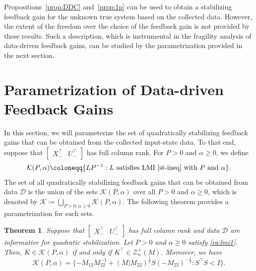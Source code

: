 \documentclass[9pt,shortpaper,twoside,web]{ieeecolor}
\newcommand{\mac}[1]{\mathcal{#1}}
\newtheorem{theorem}{Theorem}
\begin{document}
Propositions~\ref{prop:DDC} and~\ref{prop:1p} can be used to obtain a stabilizing feedback gain for the unknown true system based on the collected data. However, the extent of the freedom over the choice of the feedback gain is not provided by these results. Such a description, which is instrumental in the fragility analysis of data-driven feedback gains, can be studied by the parametrization provided in the next section.  

\section{Parametrization of Data-driven Feedback Gains}
\label{sec:III}

In this section, we will parameterize the set of quadratically stabilizing feedback gains that can be obtained from the collected input-state data. To that end, suppose that 
$\begin{bmatrix}
X_-^\top & U_-^\top
\end{bmatrix}$ has full column rank. For $P > 0$ and $\alpha\geq 0$, we define
\begin{equation}
\begin{split}
\mathcal{K}(P,\alpha)\coloneqq \{LP^{-1}:L\ \text{satisfies LMI \eqref{st-ineq} with}\ P\ \text{and}\ \alpha\}.
\end{split}
\end{equation} 
The set of all quadratically stabilizing feedback gains that can be obtained from data $\mathcal{D}$ is the union of the sets $\mathcal{K}(P,\alpha)$ over all $P>0$ and $\alpha \geq 0$, which is denoted by $\mathcal{K}\coloneqq\bigcup_{P>0,\alpha \geq 0} \mathcal{K}(P,\alpha)$. The following theorem provides a parametrization for such sets.
\begin{theorem}
\label{th:1}
Suppose that $\begin{bmatrix}
X_-^\top & U_-^\top
\end{bmatrix}$ has full column rank and data $\mac{D}$ are informative for quadratic stabilization. Let $P > 0$ and $\alpha\geq 0$ satisfy \eqref{eq:lmi1}. Then, $K \in \mac{K}(P,\alpha)$ \emph{if and only if} $K^\top \in \mac{Z}^+_n(M)$. Moreover, we have
\begin{equation}
\mathcal{K}(P,\alpha)\!\!=\!\!\{-M_{12}M_{22}^{-1}+(M|M_{22})^{\frac{1}{2}}S(-M_{22})^{-\frac{1}{2}}\!:\! S^\top\!\! S\!<\! I\}.
\label{set:kp}
\end{equation} 
\end{theorem}
\end{document}
